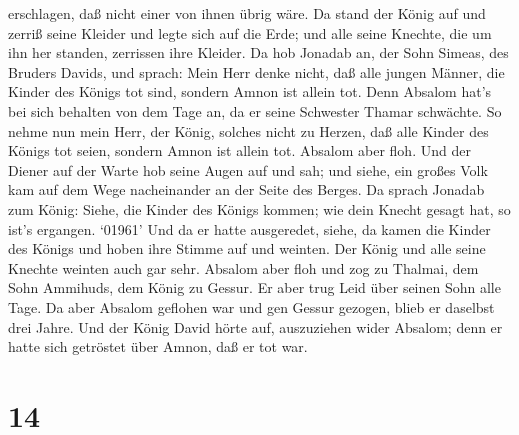erschlagen, daß nicht einer von ihnen übrig wäre.  Da stand
der König auf und zerriß seine Kleider und legte sich auf die Erde; und
alle seine Knechte, die um ihn her standen, zerrissen ihre Kleider.
 Da hob Jonadab an, der Sohn Simeas, des Bruders Davids,
und sprach: Mein Herr denke nicht, daß alle jungen Männer, die Kinder
des Königs tot sind, sondern Amnon ist allein tot. Denn Absalom hat's
bei sich behalten von dem Tage an, da er seine Schwester Thamar
schwächte.  So nehme nun mein Herr, der König, solches
nicht zu Herzen, daß alle Kinder des Königs tot seien, sondern Amnon ist
allein tot.  Absalom aber floh. Und der Diener auf der
Warte hob seine Augen auf und sah; und siehe, ein großes Volk kam auf
dem Wege nacheinander an der Seite des Berges.  Da sprach
Jonadab zum König: Siehe, die Kinder des Königs kommen; wie dein Knecht
gesagt hat, so ist's ergangen.  `01961' Und da er hatte
ausgeredet, siehe, da kamen die Kinder des Königs und hoben ihre Stimme
auf und weinten. Der König und alle seine Knechte weinten auch gar sehr.
 Absalom aber floh und zog zu Thalmai, dem Sohn Ammihuds,
dem König zu Gessur. Er aber trug Leid über seinen Sohn alle Tage.
 Da aber Absalom geflohen war und gen Gessur gezogen, blieb
er daselbst drei Jahre.  Und der König David hörte auf,
auszuziehen wider Absalom; denn er hatte sich getröstet über Amnon, daß
er tot war.

\hypertarget{section-13}{%
\section{14}\label{section-13}}

